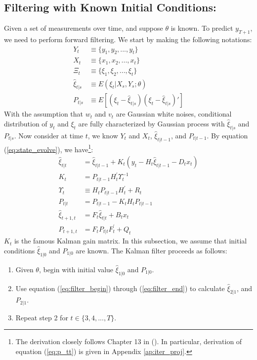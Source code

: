\documentclass[10pt]{article}
\newenvironment{boenumerate}
    {\begin{enumerate}\renewcommand\labelenumi{\textbf\theenumi}}
    {\end{enumerate}}
\numberwithin{equation}{section}
\begin{document}
\subsection{Filtering with Known Initial Conditions:}
Given a set of measurements over time, and suppose $\theta$ is known. To predict $y_{T+1}$, we need to perform forward filtering. We start by making the following notations:
\begin{align*}
    Y_t &\equiv \{y_1, y_2, ..., y_t\} \\
    X_t &\equiv \{x_1, x_2, ..., x_t\} \\
    \Xi_t &\equiv \{\xi_1,\xi_2,...,\xi_t\} \\
    \hat{\xi}_{t|s} &\equiv E(\xi_t|X_{s},Y_{s};\theta) \\
    P_{t|s} &\equiv E[(\xi_t-\hat{\xi}_{t|s})(\xi_t-\hat{\xi}_{t|s})']
\end{align*}
With the assumption that $w_t$ and $v_t$ are Gaussian white noises, conditional distribution of $y_t$ and $\xi_t$ are fully characterized by Gaussian process with $\hat{\xi}_{t|s}$ and $P_{t|s}$. Now consider at time $t$, we know $Y_t$ and $X_t$, $\hat{\xi}_{t|t-1}$, and $P_{t|t-1}$. By equation (\ref{eq:state_evolve}), we have\footnote{The derivation closely follows Chapter 13 in (\cite{hamilton_1994}). In particular, derivation of equation (\ref{eq:p_tt}) is given in Appendix \ref{ap:iter_proj}.}:
\begin{align}
    \hat{\xi}_{t|t} &= \hat{\xi}_{t|t-1} + K_t(y_t-H_t\hat{\xi}_{t|t-1}-D_tx_t) \label{eq:filter_begin} \\
    K_t &= P_{t|t-1}H_t^{'}\Upsilon_t^{-1} \label{eq:gain} \\
    \Upsilon_t &\equiv H_tP_{t|t-1}H_t^{'} + R_t \\
    P_{t|t} &= P_{t|t-1} - K_tH_tP_{t|t-1} \label{eq:p_tt} \\
    \hat{\xi}_{t+1,t} &= F_t\hat{\xi}_{t|t} + B_tx_t \label{eq:xi_t1} \\
    P_{t+1,t} &= F_tP_{t|t}F_t^{'}+Q_t \label{eq:filter_end}
\end{align}
$K_t$ is the famous Kalman gain matrix. In this subsection, we assume that initial conditions $\hat{\xi}_{1|0}$ and $P_{1|0}$ are known. The Kalman filter proceeds as follows:
\begin{boenumerate}
    \item Given $\theta$, begin with initial value $\hat{\xi}_{1|0}$ and $P_{1|0}$.
    \item Use equation (\ref{eq:filter_begin}) through (\ref{eq:filter_end}) to calculate $\hat{\xi}_{2|1}$, and $P_{2|1}$.
    \item Repeat step 2 for $t\in\{3, 4, ..., T\}$.
\end{boenumerate}
\end{document}
